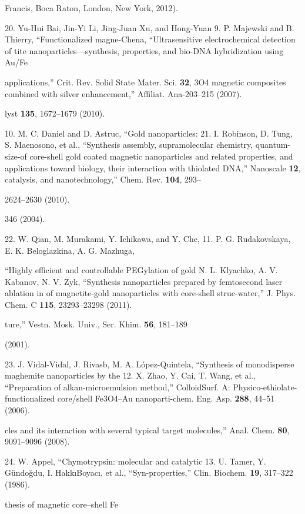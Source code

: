 \documentclass[12pt,a4paper]{article}
\begin{document}
Francis, Boca Raton, London, New York, 2012).

20. Yu-Hui Bai, Jin-Yi Li, Jing-Juan Xu, and Hong-Yuan 9. P. Majewski
and B. Thierry, ``Functionalized magne-Chena, ``Ultrasensitive
electrochemical detection of tite nanoparticles---synthesis, properties,
and bio-DNA hybridization using Au/Fe

applications,'' Crit. Rev. Solid State Mater. Sci. \textbf{32}, 3O4
magnetic composites combined with silver enhancement,'' Affiliat.
Ana-203--215 (2007).

lyst \textbf{135}, 1672--1679 (2010).

10. M. C. Daniel and D. Astruc, ``Gold nanoparticles: 21. I. Robinson,
D. Tung, S. Maenosono, et al., ``Synthesis assembly, supramolecular
chemistry, quantum-size-of core-shell gold coated magnetic nanoparticles
and related properties, and applications toward biology, their
interaction with thiolated DNA,'' Nanoscale \textbf{12}, catalysis, and
nanotechnology,'' Chem. Rev. \textbf{104}, 293--

2624--2630 (2010).

346 (2004).

22. W. Qian, M. Murakami, Y. Ichikawa, and Y. Che, 11. P. G.
Rudakovskaya, E. K. Beloglazkina, A. G. Mazhuga,

``Highly efficient and controllable PEGylation of gold N. L. Klyachko,
A. V. Kabanov, N. V. Zyk, ``Synthesis nanoparticles prepared by
femtosecond laser ablation in of magnetite-gold nanoparticles with
core-shell struc-water,'' J. Phys. Chem. C \textbf{115}, 23293--23298
(2011).

ture,'' Vestn. Mosk. Univ., Ser. Khim. \textbf{56}, 181--189

(2001).

23. J. Vidal-Vidal, J. Rivasb, M. A. López-Quintela, ``Synthesis of
monodisperse maghemite nanoparticles by the 12. X. Zhao, Y. Cai, T.
Wang, et al., ``Preparation of alkan-microemulsion method,''
ColloidSurf. A: Physico-ethiolate-functionalized core/shell Fe3O4--Au
nanoparti-chem. Eng. Asp. \textbf{288}, 44--51 (2006).

cles and its interaction with several typical target molecules,'' Anal.
Chem. \textbf{80}, 9091--9096 (2008).

24. W. Appel, ``Chymotrypsin: molecular and catalytic 13. U. Tamer, Y.
Gündoğdu, I. HakkıBoyacı, et al., ``Syn-properties,'' Clin. Biochem.
\textbf{19}, 317--322 (1986).

thesis of magnetic core--shell Fe
\end{document}
